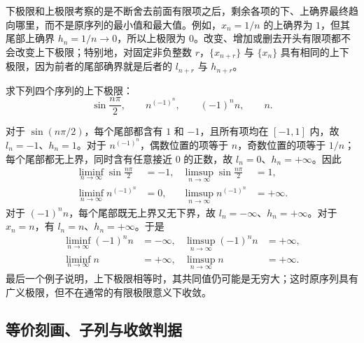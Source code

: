 \documentclass[UTF8,12pt,a4paper,fontset=fandol]{ctexbook}
\begin{document}
\begin{notealert}[title={上下极限描述尾部的边界}]
下极限和上极限考察的是不断舍去前面有限项之后，剩余各项的下、上确界最终趋向哪里，而不是原序列的最小值和最大值。例如，$x_n=1/n$ 的上确界为 $1$，但其尾部上确界 $h_n=1/n\to0$，所以上极限为 $0$。改变、增加或删去开头有限项都不会改变上下极限；特别地，对固定非负整数 $r$，$\{x_{n+r}\}$ 与 $\{x_n\}$ 具有相同的上下极限，因为前者的尾部确界就是后者的 $l_{n+r}$ 与 $h_{n+r}$。
\end{notealert}

\begin{example}
求下列四个序列的上下极限：
\[
    \sin\frac{n\pi}{2},\qquad n^{(-1)^n},\qquad (-1)^n n,\qquad n.
\]
\end{example}

\begin{solve}
对于 $\sin(n\pi/2)$，每个尾部都含有 $1$ 和 $-1$，且所有项均在 $[-1,1]$ 内，故 $l_n=-1$、$h_n=1$。对于 $n^{(-1)^n}$，偶数位置的项等于 $n$，奇数位置的项等于 $1/n$；每个尾部都无上界，同时含有任意接近 $0$ 的正数，故 $l_n=0$、$h_n=+\infty$。因此
\[
    \begin{aligned}
        \liminf_{n\to\infty}\sin\frac{n\pi}{2}&=-1,
        &\limsup_{n\to\infty}\sin\frac{n\pi}{2}&=1,\\
        \liminf_{n\to\infty}n^{(-1)^n}&=0,
        &\limsup_{n\to\infty}n^{(-1)^n}&=+\infty.
    \end{aligned}
\]
对于 $(-1)^n n$，每个尾部既无上界又无下界，故 $l_n=-\infty$、$h_n=+\infty$。对于 $x_n=n$，有 $l_n=n$、$h_n=+\infty$。于是
\[
    \begin{aligned}
        \liminf_{n\to\infty}(-1)^n n&=-\infty,
        &\limsup_{n\to\infty}(-1)^n n&=+\infty,\\
        \liminf_{n\to\infty}n&=+\infty,
        &\limsup_{n\to\infty}n&=+\infty.
    \end{aligned}
\]
最后一个例子说明，上下极限相等时，其共同值仍可能是无穷大；这时原序列具有广义极限，但不在通常的有限极限意义下收敛。
\end{solve}

\subsection{等价刻画、子列与收敛判据}
\label{subsec:liminf-limsup-characterizations}
\end{document}
